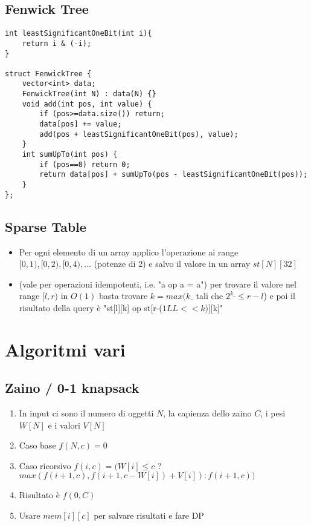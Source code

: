 \documentclass{article}
\begin{document}
\subsection{Fenwick Tree}
\begin{lstlisting}
int leastSignificantOneBit(int i){
	return i & (-i);
}

struct FenwickTree {
	vector<int> data;
	FenwickTree(int N) : data(N) {}
	void add(int pos, int value) {
		if (pos>=data.size()) return;
		data[pos] += value;
		add(pos + leastSignificantOneBit(pos), value);
	}
	int sumUpTo(int pos) {
		if (pos==0) return 0;
		return data[pos] + sumUpTo(pos - leastSignificantOneBit(pos));
	}
};
\end{lstlisting}

\subsection{Sparse Table}
\begin{itemize}
    \item Per ogni elemento di un array applico l'operazione ai range $[0,1), [0,2), [0,4), ...$ (potenze di 2) e salvo il valore in un array $st[N][32]$
    \item (vale per operazioni idempotenti, i.e. "a op a = a") per trovare il valore nel range $[l,r)$ in $O(1)$ basta trovare $k = max(k\_$ tali che $2^{k\_} \leq r-l$) e poi il risultato della query è "st[l][k] op st[r-($1LL<<k$)][k]"
\end{itemize}

\section{Algoritmi vari}

\subsection{Zaino / 0-1 knapsack}
\begin{enumerate}
    \item In input ci sono il numero di oggetti $N$, la capienza dello zaino $C$, i pesi $W[N]$ e i valori $V[N]$
    \item Caso base $f(N,c) = 0$
    \item Caso ricorsivo $f(i,c) = (W[i] \leq c$ ? $max(f(i+1, c), f(i+1, c-W[i]) + V[i]) : f(i+1, c))$
    \item Risultato è $f(0,C)$
    \item Usare $mem[i][c]$ per salvare risultati e fare DP
\end{enumerate}
\end{document}
